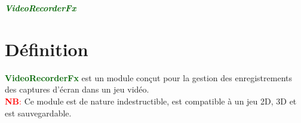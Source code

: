 \documentclass[a4paper, 11pt]{article}
\begin{document}
	\pagecolor{silver}
	\huge{\hspace{13cm}\textit{\textbf{\textcolor{darkgreen}{VideoRecorderFx}}}}\large{} \tableofcontents 
	\newpage
	\section{Définition}
	\textcolor{darkgreen}{\textbf{VideoRecorderFx}} est un module conçut pour la gestion des enregistrements 
	des captures d'écran dans un jeu vidéo.\\
	\textcolor{red}{\textbf{NB}:} Ce module est de nature indestructible, est compatible à un jeu 2D, 3D et
	est sauvegardable.

\end{document}
